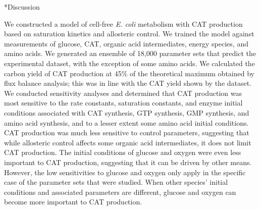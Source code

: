 \documentclass[12pt]{article}
\makeatletter
\renewcommand\section{\@startsection
	{subsection}{2}{0mm}
	{-0.2in}
	{0.05\baselineskip}
	{\normalfont\large\bfseries}}
\makeatother
\begin{document}
\section*{Discussion}


We constructed a model of cell-free \textit{E. coli} metabolism with CAT production based on saturation kinetics and allosteric control.
We trained the model against measurements of glucose, CAT, organic acid intermediates, energy species, and amino acids.
We generated an ensemble of 18,000 parameter sets that predict the experimental dataset, with the exception of some amino acids.
We calculated the carbon yield of CAT production at 45\% of the theoretical maximum obtained by flux balance analysis; this was in line with the CAT yield shown by the dataset.
We conducted sensitivity analyses and determined that CAT production was most sensitive to the rate constants, saturation constants, and enzyme initial conditions associated with CAT synthesis, GTP synthesis, GMP synthesis, and amino acid synthesis, and to a lesser extent some amino acid initial conditions.
CAT production was much less sensitive to control parameters, suggesting that while allosteric control affects some organic acid intermediates, it does not limit CAT production.
The initial conditions of glucose and oxygen were even less important to CAT production, suggesting that it can be driven by other means.
However, the low sensitivities to glucose and oxygen only apply in the specific case of the parameter sets that were studied.
When other species' initial conditions and associated parameters are different, glucose and oxygen can become more important to CAT production.
\end{document}
